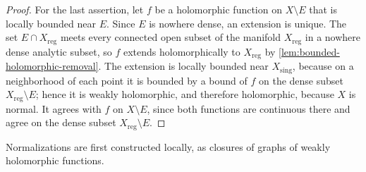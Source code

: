 \begin{proof}
For the last assertion, let $f$ be a holomorphic function on $X\setminus E$ that is locally bounded near $E$. Since $E$ is nowhere dense, an extension is unique. The set $E\cap X_{\mathrm{reg}}$ meets every connected open subset of the manifold $X_{\mathrm{reg}}$ in a nowhere dense analytic subset, so $f$ extends holomorphically to $X_{\mathrm{reg}}$ by \cref{lem:bounded-holomorphic-removal}. The extension is locally bounded near $X_{\mathrm{sing}}$, because on a neighborhood of each point it is bounded by a bound of $f$ on the dense subset $X_{\mathrm{reg}}\setminus E$; hence it is weakly holomorphic, and therefore holomorphic, because $X$ is normal. It agrees with $f$ on $X\setminus E$, since both functions are continuous there and agree on the dense subset $X_{\mathrm{reg}}\setminus E$.
\end{proof}

Normalizations are first constructed locally, as closures of graphs of weakly holomorphic functions.

